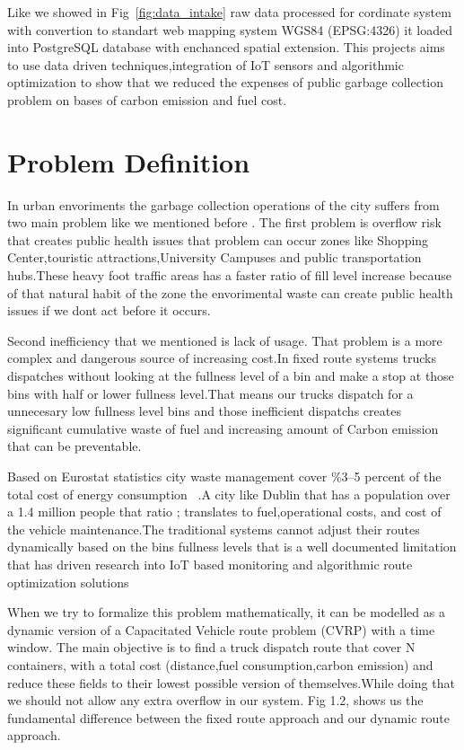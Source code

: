 \documentclass[12pt,a4paper]{report}
\begin{document}
\indent Like we showed in Fig~\ref{fig:data_intake} raw data processed for cordinate system with convertion to standart web mapping system WGS84 (EPSG:4326) it loaded into PostgreSQL database with enchanced spatial extension. This projects aims to use data driven techniques,integration of IoT sensors and algorithmic optimization to show that we reduced the expenses of public garbage collection problem on bases of carbon emission and fuel cost.
\section{Problem Definition}

\indent In urban envoriments the garbage collection operations of the city suffers from two main problem like we mentioned before . The first problem is overflow risk that creates public health issues that problem can occur zones like Shopping Center,touristic attractions,University Campuses and public transportation hubs.These heavy foot traffic areas has a faster ratio of fill level increase because of that natural habit of the zone the envorimental waste can create public health issues if we dont act before it occurs.


\indent Second inefficiency that we mentioned is lack of usage. That problem is a more complex and dangerous source of increasing cost.In fixed route systems trucks dispatches without looking at the fullness level of a bin and make a stop at those bins with half or lower fullness level.That means our trucks dispatch for a unnecesary low fullness level bins  and those inefficient dispatchs creates  significant cumulative waste of fuel and increasing amount of Carbon emission that can be preventable.


\indent Based on Eurostat statistics city waste management cover \%3--5 percent of the total cost of energy consumption ~\cite{eurostat2022}.A city like Dublin that has a population over a 1.4 million people that ratio ; translates to fuel,operational costs, and cost of the vehicle maintenance.The traditional systems cannot adjust their routes dynamically based on the bins fullness levels that is a well documented limitation that has driven research into IoT based monitoring and algorithmic route optimization solutions

\indent When we try to formalize this problem mathematically, it can be modelled as a dynamic version of a Capacitated Vehicle route problem (CVRP) with a time window. The main objective is to find a truck dispatch route that cover N containers, with a total cost (distance,fuel consumption,carbon emission) and reduce these fields to their lowest possible version of themselves.While doing that we should not allow any extra overflow in our system. Fig 1.2, shows us the fundamental difference between the fixed route approach and our dynamic route approach.
\end{document}
